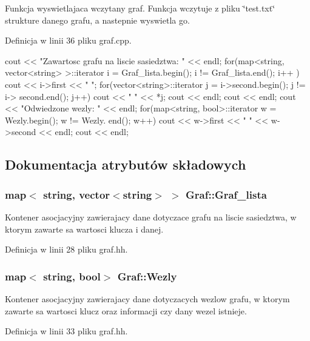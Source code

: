 \-Funkcja wyswietlajaca wczytany graf. \-Funkcja wczytuje z pliku \char`\"{}test.\-txt\char`\"{} strukture danego grafu, a nastepnie wyswietla go. 



\-Definicja w linii 36 pliku graf.\-cpp.


\begin{DoxyCode}
{
        cout << "Zawartosc grafu na liscie sasiedztwa: " << endl;
        for(map<string, vector<string> >::iterator i = Graf_lista.begin(); i !=
       Graf_lista.end(); i++ )
        {
                cout << i->first << " ";
                for(vector<string>::iterator j = i->second.begin(); j != i->
      second.end(); j++)
                {
                        cout << " " << *j;
                }
                cout << endl;
        }
                cout << endl;
                cout << "Odwiedzone wezly: " << endl;
                for(map<string, bool>::iterator w = Wezly.begin(); w != Wezly.
      end(); w++)
                {       
                        cout << w->first << " " << w->second << endl;
                }
                cout << endl;
}
\end{DoxyCode}


\subsection{\-Dokumentacja atrybutów składowych}
\hypertarget{class_graf_aaa7c380bf6a9ba69f5e62b01f1c8b2fb}{
\subsubsection[{\-Graf\-\_\-lista}]{\setlength{\rightskip}{0pt plus 5cm}map$<$ string, vector$<$string$>$ $>$ {\bf \-Graf\-::\-Graf\-\_\-lista}}}\label{class_graf_aaa7c380bf6a9ba69f5e62b01f1c8b2fb}


\-Kontener asocjacyjny zawierajacy dane dotyczace grafu na liscie sasiedztwa, w ktorym zawarte sa wartosci klucza i danej. 



\-Definicja w linii 28 pliku graf.\-hh.

\hypertarget{class_graf_a22f37aaae1c0468096d3a281f661187a}{
\subsubsection[{\-Wezly}]{\setlength{\rightskip}{0pt plus 5cm}map$<$ string, bool$>$ {\bf \-Graf\-::\-Wezly}}}\label{class_graf_a22f37aaae1c0468096d3a281f661187a}


\-Kontener asocjacyjny zawierajacy dane dotyczacych wezlow grafu, w ktorym zawarte sa wartosci klucz oraz informacji czy dany wezel istnieje. 



\-Definicja w linii 33 pliku graf.\-hh.

